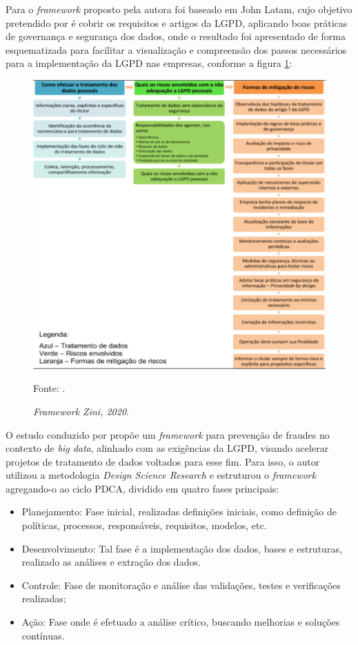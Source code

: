 \documentclass[
	12pt,				%
	openright,			%
	oneside,			%
	a4paper,			%
	english,			%
	french,				%
	spanish,			%
	brazil,				%
	]{abntex2}
\begin{document}
Para o \textit{framework} proposto pela autora foi baseado em John Latam, cujo objetivo pretendido por \cite{Zini2020} é cobrir os requisitos e artigos da LGPD, aplicando boas práticas de governança e segurança dos dados, onde o resultado foi apresentado de forma esquematizada para facilitar a visualização e compreensão dos passos necessários para a implementação da LGPD nas empresas, conforme a figura \ref{fig: zini}:
\begin{figure}[ht]
    \centering
    \caption{\textit{Framework Zini, 2020}.}
    \includegraphics[width=4.9in]{Images/11Zini.png}
    \label{fig: zini}
    
    \centering \small Fonte: \cite{Zini2020}.
\end{figure}

\pagebreak


O estudo conduzido por   propõe um \textit{framework} para prevenção de fraudes no contexto de \textit{big data}, alinhado com as exigências da LGPD, visando acelerar projetos de tratamento de dados voltados para esse fim. Para isso, o autor utilizou a metodologia \textit{Design Science Research} e estruturou o \textit{framework} agregando-o ao ciclo PDCA, dividido em quatro fases principais:
\begin{itemize}
\item Planejamento: Fase inicial, realizadas definições iniciais, como definição de políticas, processos, responsáveis, requisitos, modelos, etc.
\item Desenvolvimento: Tal fase é a implementação dos dados, bases e estruturas, realizado as análises e extração dos dados.
\item Controle: Fase de monitoração e análise das validações, testes e verificações realizadas;
\item Ação: Fase onde é efetuado a análise crítico, buscando melhorias e soluções contínuas.
\end{itemize}
\end{document}

